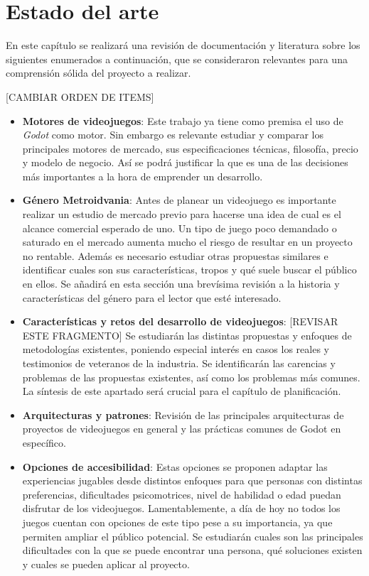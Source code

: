\chapter{Estado del arte}

En este capítulo se realizará una revisión de documentación y literatura sobre los siguientes enumerados a continuación, que se consideraron relevantes para una comprensión sólida del proyecto a realizar.

[CAMBIAR ORDEN DE ITEMS]
\begin{itemize}
    \item \textbf{Motores de videojuegos}: Este trabajo ya tiene como premisa el uso de \textit{Godot} como motor. Sin embargo es relevante estudiar y comparar los principales motores de mercado, sus especificaciones técnicas, filosofía, precio y modelo de negocio. Así se podrá justificar la que es una de las decisiones más importantes a la hora de emprender un desarrollo.
    
    \item \textbf{Género Metroidvania}: Antes de planear un videojuego es importante realizar un estudio de mercado previo para hacerse una idea de cual es el alcance comercial esperado de uno. Un tipo de juego poco demandado o saturado en el mercado aumenta mucho el riesgo de resultar en un proyecto no rentable. Además es necesario estudiar otras propuestas similares e identificar cuales son sus características, tropos y qué suele buscar el público en ellos. Se añadirá en esta sección una brevísima revisión a la historia y características del género para el lector que esté interesado.
    
    \item \textbf{Características y retos del desarrollo de videojuegos}: [REVISAR ESTE FRAGMENTO] Se estudiarán las distintas propuestas y enfoques de metodologías existentes, poniendo especial interés en casos los reales y testimonios de veteranos de la industria. Se identificarán las carencias y problemas de las propuestas existentes, así como los problemas más comunes. La síntesis de este apartado será crucial para el capítulo de planificación.
    
    \item \textbf{Arquitecturas y patrones}: Revisión de las principales arquitecturas de proyectos de videojuegos en general y las prácticas comunes de Godot en específico.
    
    \item \textbf{Opciones de accesibilidad}: Estas opciones se proponen adaptar las experiencias jugables desde distintos enfoques para que personas con distintas preferencias, dificultades psicomotrices, nivel de habilidad o edad puedan disfrutar de los videojuegos. Lamentablemente, a día de hoy no todos los juegos cuentan con opciones de este tipo pese a su importancia, ya que permiten ampliar el público potencial. Se estudiarán cuales son las principales dificultades con la que se puede encontrar una persona, qué soluciones existen y cuales se pueden aplicar al proyecto.
    

\end{itemize}
